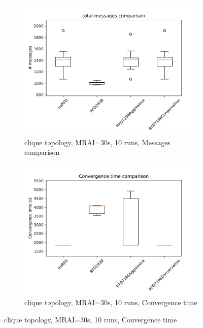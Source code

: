 \begin{figure}[h]
     \centering
     \begin{subfigure}[b]{0.3\textwidth}
         \centering
         \includegraphics[width=\textwidth]{images/RFD/clique/clique_rfd_comparison_messages_boxplot.pdf}
         \caption{clique topology, MRAI=30s, 10 runs, Messages comparison}
         \label{fig:RFD_MRAI30_messages}
     \end{subfigure}
     \hfill
     \begin{subfigure}[b]{0.3\textwidth}
         \centering
         \includegraphics[width=\textwidth]{images/RFD/clique/clique_rfd_comparison_time_boxplot.pdf}
         \caption{clique topology, MRAI=30s, 10 runs, Convergence time}

\end{subfigure}
\end{figure}
